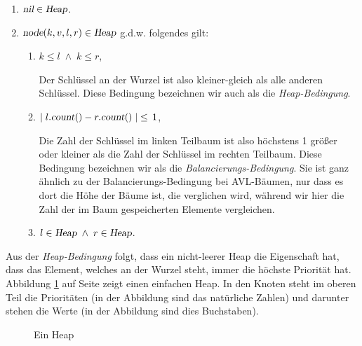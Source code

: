 \begin{enumerate}
\item $\textsl{nil} \in \textsl{Heap}$.
\item $\textsl{node}(k,v,l,r) \in \textsl{Heap}$ g.d.w. folgendes gilt:
      \begin{enumerate}
      \item $k \leq l \;\wedge\; k \leq r$,

            Der Schl\"ussel an der Wurzel ist also kleiner-gleich als alle anderen Schl\"ussel.
            Diese Bedingung bezeichnen wir auch als die \emph{Heap-Bedingung}.
      \item $\mid l.\textsl{count}() - r.\textsl{count}() \mid \;\leq\, 1$,

            Die Zahl der Schl\"ussel im linken Teilbaum ist also h\"ochstens 1 gr\"o{\ss}er oder
            kleiner als die Zahl der Schl\"ussel im rechten Teilbaum.
            Diese Bedingung bezeichnen wir als die \emph{Balancierungs-Bedingung}.  Sie ist
            ganz \"ahnlich zu der Balancierungs-Bedingung bei AVL-B\"aumen, nur dass es dort
            die H\"ohe der B\"aume ist, die verglichen wird, w\"ahrend wir hier die Zahl der
            im Baum gespeicherten Elemente vergleichen.
      \item $l \in \textsl{Heap} \;\wedge\; r \in \textsl{Heap}$.
      \end{enumerate}
\end{enumerate}
Aus der \emph{Heap-Bedingung} folgt, dass ein nicht-leerer Heap die Eigenschaft hat, dass
das Element, welches an der Wurzel steht, immer die h\"ochste Priorit\"at hat.  Abbildung
\ref{fig:heap-list} auf Seite \pageref{fig:heap-list} zeigt einen einfachen Heap.
In den Knoten steht im oberen Teil die Priorit\"aten (in der Abbildung sind das nat\"urliche Zahlen) und
darunter stehen die Werte (in der Abbildung sind dies Buchstaben).

\begin{figure}[!t]
  \centering
  \caption{Ein Heap}
  \label{fig:heap-list}
\end{figure}



